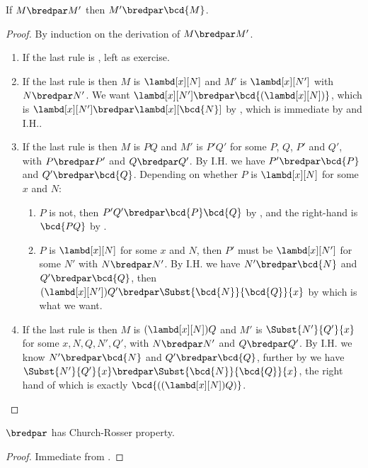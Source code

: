 \documentclass[../../../include/open-logic-section]{subfiles}
\begin{document}
\begin{lem}
  If $M \bredpar M'$ then $M' \bredpar \bcd{M}$.
\end{lem}
\begin{proof}
  By induction on the derivation of $M \bredpar M'$.
  \begin{enumerate}
    \item If the last rule is , left as exercise.
    \item If the last rule is  then $M$ is 
      $\lambd[x][N]$ and $M'$ is $\lambd[x][N']$ with
      $N \bredpar N'$. We want $\lambd[x][N'] \bredpar
      \bcd{(\lambd[x][N])}$, which is $\lambd[x][N'] \bredpar
      \lambd[x][\bcd{N}]$ by , which is immediate by
       and I.H.. 
    \item If the last rule is  then $M$ is 
      $PQ$ and $M'$ is $P'Q'$ for some $P$, $Q$, $P'$ and $Q'$, with $P \bredpar P'$
      and $Q \bredpar Q'$. By I.H. we have $P' \bredpar \bcd{P}$ and
      $Q' \bredpar \bcd{Q}$.  Depending on whether $P$ is 
      $\lambd[x][N]$ for some $x$ and $N$:
      \begin{enumerate}
        \item $P$ is not, then $P'Q' \bredpar \bcd{P}\bcd{Q}$ by
          , and the right-hand is $\bcd{PQ}$ by .
        \item $P$ is $\lambd[x][N]$ for some $x$ and $N$, then
          $P'$ must be $\lambd[x][N']$ for some $N'$ with 
          $N \bredpar N'$. By I.H. we have $N' \bredpar \bcd{N}$ and
          $Q' \bredpar \bcd{Q}$, then $(\lambd[x][N'])Q' \bredpar
          \Subst{\bcd{N}}{\bcd{Q}}{x}$ by  which is what
          we want.
      \end{enumerate}
    \item If the last rule is  then $M$ is 
      $(\lambd[x][N])Q$  and $M'$ is $\Subst{N'}{Q'}{x}$
      for some $x, N, Q, N', Q'$, with $N \bredpar N'$ and $Q
      \bredpar Q'$. By I.H. we know $N' \bredpar \bcd{N}$ and $Q'
      \bredpar \bcd{Q}$, further by  we have
      $\Subst{N'}{Q'}{x} \bredpar \Subst{\bcd{N}}{\bcd{Q}}{x}$, the
      right hand of which is exactly $\bcd{((\lambd[x][N])Q)}$.
  \end{enumerate}
\end{proof}

\begin{thm}
  $\bredpar$ has Church-Rosser property.
\end{thm}
\begin{proof}
  Immediate from .
\end{proof}
\end{document}
